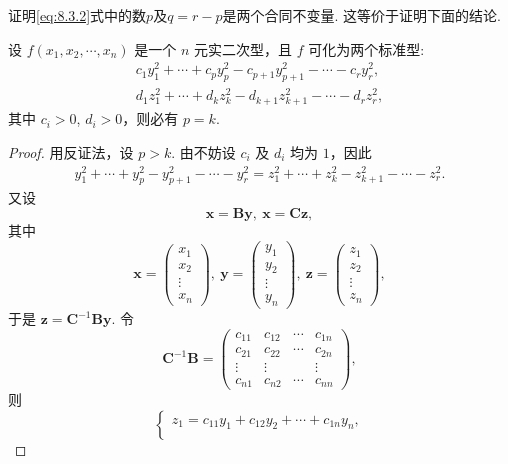 \documentclass[../../main.tex]{subfiles}%
\begin{document}
\begin{theorem}[惯性定理]\label{theorem:惯性定理}
证明\eqref{eq:8.3.2}式中的数$p$及$q=r-p$是两个合同不变量.
这等价于证明下面的结论.

设 $f(x_1,x_2,\cdots,x_n)$ 是一个 $n$ 元实二次型，且 $f$ 可化为两个标准型:
\begin{align*}
c_1y_1^2+\cdots + c_py_p^2 - c_{p + 1}y_{p + 1}^2 - \cdots - c_ry_r^2,\\
d_1z_1^2+\cdots + d_kz_k^2 - d_{k + 1}z_{k + 1}^2 - \cdots - d_rz_r^2,
\end{align*}
其中 $c_i>0$, $d_i>0$，则必有 $p = k$.
\end{theorem}
\begin{proof}

用反证法，设 $p>k$. 由不妨设 $c_i$ 及 $d_i$ 均为 $1$，因此
\begin{align}
y_1^2+\cdots + y_p^2 - y_{p + 1}^2 - \cdots - y_r^2 = z_1^2+\cdots + z_k^2 - z_{k + 1}^2 - \cdots - z_r^2.\label{eq:8.3.4}
\end{align}
又设
\[
\boldsymbol{x}=\boldsymbol{B}\boldsymbol{y},\ \boldsymbol{x}=\boldsymbol{C}\boldsymbol{z},
\]
其中
\[
\boldsymbol{x}=\begin{pmatrix}
x_1\\
x_2\\
\vdots\\
x_n
\end{pmatrix},\ \boldsymbol{y}=\begin{pmatrix}
y_1\\
y_2\\
\vdots\\
y_n
\end{pmatrix},\ \boldsymbol{z}=\begin{pmatrix}
z_1\\
z_2\\
\vdots\\
z_n
\end{pmatrix},
\]
于是 $\boldsymbol{z}=\boldsymbol{C}^{-1}\boldsymbol{B}\boldsymbol{y}$. 令
\[
\boldsymbol{C}^{-1}\boldsymbol{B}=\begin{pmatrix}
c_{11} & c_{12} & \cdots & c_{1n}\\
c_{21} & c_{22} & \cdots & c_{2n}\\
\vdots & \vdots & & \vdots\\
c_{n1} & c_{n2} & \cdots & c_{nn}
\end{pmatrix},
\]
则
\[
\begin{cases}
z_1 = c_{11}y_1 + c_{12}y_2 + \cdots + c_{1n}y_n,\\

\end{cases}\]
\end{proof}
\end{document}

